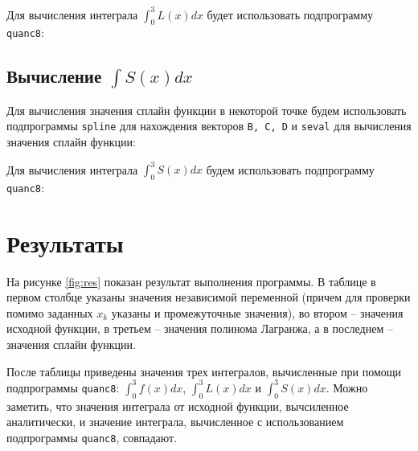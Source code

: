 
\parindent=1cm

Для вычисления интеграла $\int_0^3 L(x)dx$ будет использовать подпрограмму \texttt{quanc8}:


\parindent=1cm


\parindent=1cm

\subsection{Вычисление $\int S(x)dx$}

Для вычисления значения сплайн функции в некоторой точке будем использовать подпрограммы \texttt{spline} для нахождения векторов \texttt{B, C, D} и \texttt{seval} для вычисления значения сплайн функции:


\parindent=1cm

Для вычисления интеграла $\int_0^3 S(x)dx$ будем использовать подпрограмму \texttt{quanc8}:


\parindent=1cm


\parindent=1cm

\section{Результаты}

На рисунке \ref{fig:res} показан результат выполнения программы. В таблице в первом столбце указаны значения независимой переменной (причем для проверки помимо заданных $x_k$ указаны и промежуточные значения), во втором -- значения исходной функции, в третьем -- значения полинома Лагранжа, а в последнем -- значения сплайн функции.

После таблицы приведены значения трех интегралов, вычисленные при помощи подпрограммы \texttt{quanc8}: $\int_0^3 f(x)dx$, $\int_0^3 L(x)dx$ и $\int_0^3 S(x)dx$. Можно заметить, что значения интеграла от исходной функции, вычсиленное аналитически, и значение интеграла, вычисленное с использованием подпрограммы \texttt{quanc8}, совпадают.

